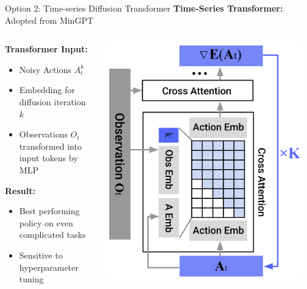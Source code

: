 \documentclass{beamer}
\begin{document}
\begin{frame}[t]{Option 2: Time-series Diffusion Transformer}
    \textbf{Time-Series Transformer:} Adopted from MinGPT 
	\begin{columns}
		\begin{column}{.5\textwidth}
            \textbf{Transformer Input:}
            \begin{itemize}[label=-]
                \item Noisy Actions $A_t^k$ 
                \item Embedding for diffusion iteration $k$
                \item Observations $O_t$ transformed into input tokens by MLP
            \end{itemize}
            \textbf{Result:}
            \begin{itemize}[label=-]
                \item Best performing policy on even complicated tasks
                \item  Sensitive to hyperparameter tuning
            \end{itemize}
		\end{column}
		\begin{column}{.5\textwidth}
			\begin{center}
                \includegraphics[width=0.95\textwidth]{./img/tft_diffusion.png}
			\end{center}
		\end{column}
	\end{columns}
\end{frame}
\end{document}
